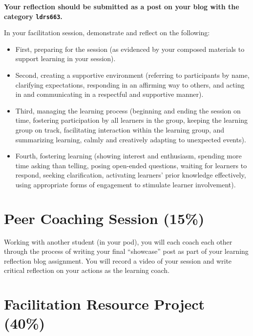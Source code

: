 \documentclass[
]{book}
\providecommand{\tightlist}{%
  \setlength{\itemsep}{0pt}\setlength{\parskip}{0pt}}
\begin{document}
\textbf{Your reflection should be submitted as a post on your blog with the category \texttt{ldrs663}.}

In your facilitation session, demonstrate and reflect on the following:

\begin{itemize}
\tightlist
\item
  First, preparing for the session (as evidenced by your composed materials to support learning in your session).\\
\item
  Second, creating a supportive environment (referring to participants by name, clarifying expectations, responding in an affirming way to others, and acting in and communicating in a respectful and supportive manner).\\
\item
  Third, managing the learning process (beginning and ending the session on time, fostering participation by all learners in the group, keeping the learning group on track, facilitating interaction within the learning group, and summarizing learning, calmly and creatively adapting to unexpected events).\\
\item
  Fourth, fostering learning (showing interest and enthusiasm, spending more time asking than telling, posing open-ended questions, waiting for learners to respond, seeking clarification, activating learners' prior knowledge effectively, using appropriate forms of engagement to stimulate learner involvement).
\end{itemize}

\hypertarget{peer-coaching-session-15}{%
\section*{Peer Coaching Session (15\%)}\label{peer-coaching-session-15}}

Working with another student (in your pod), you will each coach each other through the process of writing your final ``showcase'' post as part of your learning reflection blog assignment. You will record a video of your session and write critical reflection on your actions as the learning coach.

\hypertarget{facilitation-resource-project-40}{%
\section*{Facilitation Resource Project (40\%)}\label{facilitation-resource-project-40}}
\end{document}
